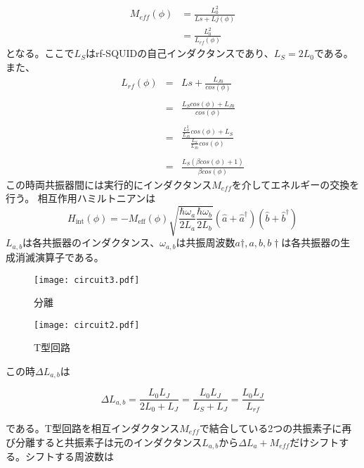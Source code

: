 \begin{eqnarray}
    M_{eff}(\phi) & = \frac{L_0^2}{Ls+Lj(\phi)}\\
    & =\frac{L_0^2}{L_{rf}(\phi)}
\end{eqnarray}
となる。ここで$L_S$はrf-SQUIDの自己インダクタンスであり、$L_S = 2 L_0$である。
また、
\begin{eqnarray}
    L_{rf}(\phi)  &=& Ls+\frac{L_{J0}}{cos(\phi)}\\ \\
    &=& \frac{L_S cos(\phi)+L_{J0}}{cos(\phi)}\\ \\
    &=& \frac{\frac{L_S^2}{L_{J0}} cos(\phi)+L_S}{\frac{L_S}{L_{J0}}cos(\phi)}\\ \\
    &=& \frac{L_S(\beta cos(\phi)+1)}{\beta cos(\phi)}
\end{eqnarray}
この時両共振器間には実行的にインダクタンス$M_{eff}$を介してエネルギーの交換を行う。
相互作用ハミルトニアンは
\begin{equation}
    H_{\mathrm{int}}(\phi)=-M_{\mathrm{eff}}(\phi) \sqrt{\frac{\hbar \omega_{a}}{2 L_{a}} \frac{\hbar \omega_{b}}{2 L_{b}}}\left(\hat{a}+\hat{a}^{\dagger}\right)\left(\hat{b}+\hat{b}^{\dagger}\right)
\end{equation}
$L_{a,b}$は各共振器のインダクタンス、$\omega_{a,b}$は共振周波数$a\dagger,a,b,b\dagger$は各共振器の生成消滅演算子である。

\begin{figure}[H]
    \begin{minipage}[t]{0.5\columnwidth}
        \centering
        \texttt{[image: circuit3.pdf]}
        \caption{分離}
    \end{minipage}%
    \begin{minipage}[t]{0.5\columnwidth}
        \centering
        \texttt{[image: circuit2.pdf]}
        \caption{T型回路}
    \end{minipage}
\end{figure}
この時$\Delta L_{a,b}$は

\begin{equation}
    \Delta L_{a,b} = \frac{L_0L_J}{2L_0+L_J} = \frac{L_0L_J}{L_S+L_J} = \frac{L_0L_J}{L_{rf}}
\end{equation}

である。T型回路を相互インダクタンス$M_{eff}$で結合している2つの共振素子に再び分離すると共振素子は元のインダクタンス$L_{a,b}$から$\Delta L_a + M_{eff}$だけシフトする。シフトする周波数は

